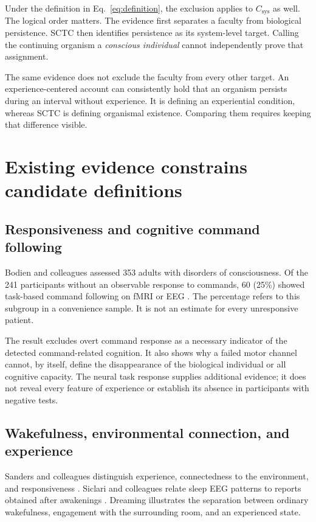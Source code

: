 \documentclass[11pt,letterpaper]{article}
\begin{document}
Under the definition in Eq.~\ref{eq:definition}, the exclusion applies to $C_{\mathrm{sys}}$ as well. The logical order matters. The evidence first separates a faculty from biological persistence. SCTC then identifies persistence as its system-level target. Calling the continuing organism a \emph{conscious individual} cannot independently prove that assignment.

The same evidence does not exclude the faculty from every other target. An experience-centered account can consistently hold that an organism persists during an interval without experience. It is defining an experiential condition, whereas SCTC is defining organismal existence. Comparing them requires keeping that difference visible.

\section{Existing evidence constrains candidate definitions}
\subsection*{Responsiveness and cognitive command following}
Bodien and colleagues assessed 353 adults with disorders of consciousness. Of the 241 participants without an observable response to commands, 60 (25\%) showed task-based command following on fMRI or EEG \cite{Bodien2024}. The percentage refers to this subgroup in a convenience sample. It is not an estimate for every unresponsive patient.

The result excludes overt command response as a necessary indicator of the detected command-related cognition. It also shows why a failed motor channel cannot, by itself, define the disappearance of the biological individual or all cognitive capacity. The neural task response supplies additional evidence; it does not reveal every feature of experience or establish its absence in participants with negative tests.

\subsection*{Wakefulness, environmental connection, and experience}
Sanders and colleagues distinguish experience, connectedness to the environment, and responsiveness \cite{Sanders2012}. Siclari and colleagues relate sleep EEG patterns to reports obtained after awakenings \cite{Siclari2017}. Dreaming illustrates the separation between ordinary wakefulness, engagement with the surrounding room, and an experienced state.
\end{document}
